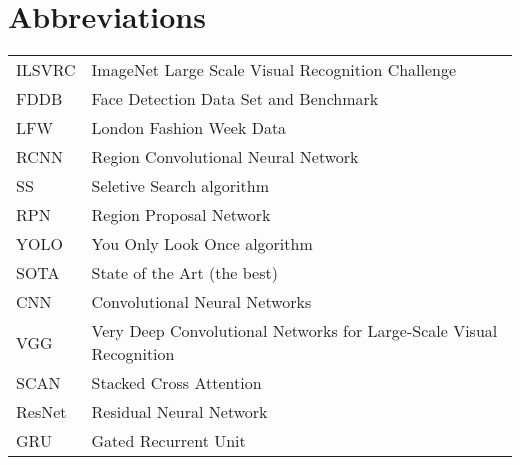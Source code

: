 \documentclass[master=mai,masteroption=bda]{kulemt}
\begin{document}
\section*{Abbreviations}
\begin{flushleft}
  \renewcommand{\arraystretch}{1.1}
  \begin{tabularx}{\textwidth}{@{}p{12mm}X@{}}
    ILSVRC & ImageNet Large Scale Visual Recognition Challenge \\
    FDDB   & Face Detection Data Set and Benchmark \\
    LFW   & London Fashion Week Data \\
    RCNN  & Region Convolutional Neural Network \\
    SS   & Seletive Search algorithm \\
    RPN & Region Proposal Network \\
    YOLO & You Only Look Once algorithm \\
    SOTA & State of the Art (the best) \\
    CNN & Convolutional Neural Networks \\
    VGG & Very Deep Convolutional Networks for Large-Scale Visual Recognition \\
    SCAN & Stacked Cross Attention \\
    ResNet & Residual Neural Network \\
    GRU & Gated Recurrent Unit
  \end{tabularx}
\end{flushleft}

\mainmatter





%


\appendix

%

\backmatter


\end{document}
